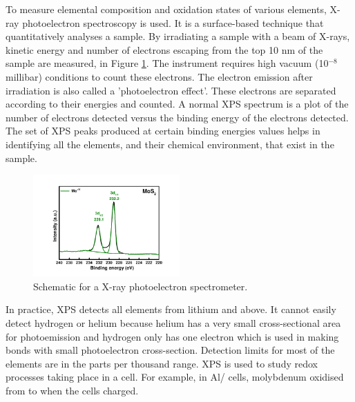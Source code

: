 To measure elemental composition and oxidation states of various elements, X-ray photoelectron spectroscopy is used. It is a surface-based technique that quantitatively analyses a sample. By irradiating a sample with a beam of X-rays, kinetic energy and number of electrons escaping from the top 10 nm of the sample are measured, in Figure \ref{Figures/chap2fig:XPS}. The instrument requires high vacuum (10$^{-8}$ millibar) conditions to count these electrons. The electron emission after irradiation is also called a 'photoelectron effect'. These electrons are separated according to their energies and counted. A normal XPS spectrum is a plot of the number of electrons detected versus the binding energy of the electrons detected. The set of XPS peaks produced at certain binding energies values helps in identifying all the elements, and their chemical environment, that exist in the sample. 

\begin{figure}[tbh!]
\centering
\includegraphics[width=0.5\textwidth]{Figures/chap2fig/XPS}
\caption{Schematic for a X-ray photoelectron spectrometer.}
\label{Figures/chap2fig:XPS}
\end{figure}

In practice, XPS detects all elements from lithium and above. It cannot easily detect hydrogen or helium because helium has a very small cross-sectional area for photoemission and hydrogen only has one electron which is used in making bonds with  small photoelectron cross-section. Detection limits for most of the elements are in the parts per thousand range. XPS is used to study redox processes taking place in a cell. For example, in Al/ cells, molybdenum oxidised from  to  when the cells charged. 

